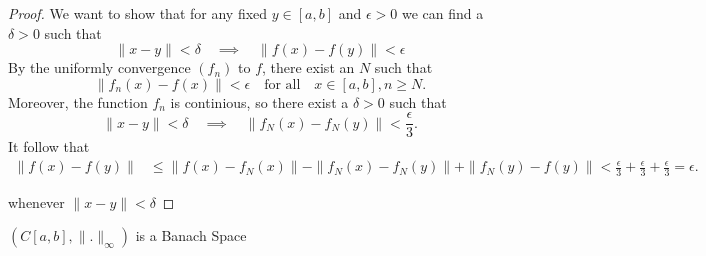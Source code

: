 \documentclass{article}
\theoremstyle{remark}
\begin{document}
\begin{proof}
  We want to show that for any fixed $y \in [a,b]$ and $\epsilon > 0$ we can find a $\delta > 0 $ such that \[
    \|x-y\| < \delta \quad \implies \quad \|f\left( x \right) - f\left( y \right) \| < \epsilon 
  \] By the uniformly convergence $\left( f_n \right) $ to $f$, there exist an $N$ such that \[
  \|f_n\left( x \right) - f\left( x \right) \| < \epsilon \quad \text{for all} \quad x \in [a,b], n\ge N. 
  \] 
  Moreover, the function $f_n$ is continious, so there exist a $\delta >0 $ such that \[
    \|x-y\| < \delta \quad \implies \quad \|f_N\left( x \right) - f_N\left( y \right) \| < \frac{\epsilon}{3}. 
  \] 
  It follow that 
  \begin{align*}
    \|f\left( x \right) - f\left( y \right) \| &\le \|f\left( x \right) - f_N\left( x \right) \| - \|f_N\left( x \right) - f_N\left( y \right) \| + \|f_N\left( y \right) - f\left( y \right) \|
                                               < \frac{\epsilon}{3} + \frac{\epsilon}{3} + \frac{\epsilon}{3} = \epsilon
  .\end{align*}

  whenever $\|x-y\| < \delta$
\end{proof}


\begin{theorem}
  $\left( C[a,b] , \|.\|_{\infty} \right) $ is a Banach Space 
\end{theorem}
\end{document}
